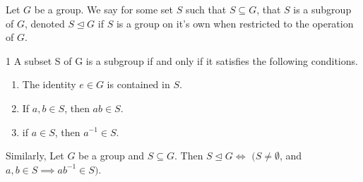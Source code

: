\begin{defn}{1}
		Let $G$ be a group. We say for some set $S$ such that $S\subseteq G$, that $S$ is a subgroup of $G$, denoted $S \trianglelefteq G$ if $S$ is a group on it's own when restricted to the operation of $G$.
\end{defn}

\newpage

\begin{theo}{1}
	A subset S of G is a subgroup if and only if it satisfies the following conditions.
	\begin{enumerate}
		\item The identity $e \in G$ is contained in $S$.
		\item If $a,b \in S$, then $ab \in S$.
		\item if $a \in S$, then $a^{-1} \in S$.	
	\end{enumerate}
	Similarly, Let $G$ be a group and $S\subseteq G$. Then $S \trianglelefteq G \Longleftrightarrow$ $(S \neq \emptyset$, and $a,b \in S \implies ab^{-1}\in S)$.
\end{theo}
